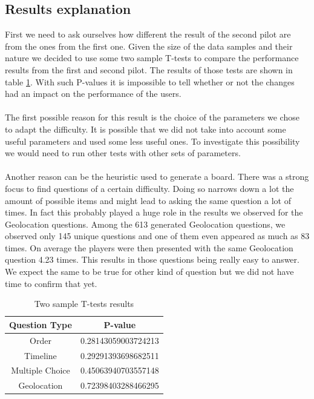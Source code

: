\subsection{Results explanation}\label{subsec:explained}
First we need to ask ourselves how different the result of the second pilot are from the ones from the first one. Given the size of the data samples and their nature we decided to use some two sample T-tests to compare the performance results from the first and second pilot. The results of those tests are shown in table \ref{table:pvals}. With such P-values it is impossible to tell whether or not the changes had an impact on the performance of the users.\\\\
The first possible reason for this result is the choice of the parameters we chose to adapt the difficulty. It is possible that we did not take into account some useful parameters and used some less useful ones. To investigate this possibility we would need to run other tests with other sets of parameters.\\\\
Another reason can be the heuristic used to generate a board. There was a strong focus to find questions of a certain difficulty. Doing so narrows down a lot the amount of possible items and might lead to asking the same question a lot of times. In fact this probably played a huge role in the results we observed for the Geolocation questions. Among the 613 generated Geolocation questions, we observed only 145 unique questions and one of them even appeared as much as 83 times. On average the players were then presented with the same Geolocation question 4.23 times. This results in those questions being really easy to answer. We expect the same to be true for other kind of question but we did not have time to confirm that yet.

\begin{table}[ht]
\caption{Two sample T-tests results}
\centering
\begin{tabular}{c c}
\hline\hline
Question Type & P-value \\ [0.5ex]

\hline
Order & 0.28143059003724213 \\
Timeline & 0.29291393698682511 \\
Multiple Choice & 0.45063940703557148 \\
Geolocation & 0.72398403288466295 \\ [1ex]
\hline
\end{tabular}
\label{table:pvals}
\end{table}

